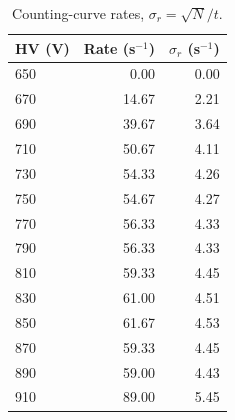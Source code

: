 \begin{table}[htbp]
\centering
\caption{Counting-curve rates, $\sigma_r=\sqrt{N}/t$.}
\label{tab:counting-rates}
\begin{tabular}{lrr}
\toprule
HV (V) & Rate (s$^{-1}$) & $\sigma_r$ (s$^{-1}$) \\
\midrule
650 & 0.00 & 0.00 \\
670 & 14.67 & 2.21 \\
690 & 39.67 & 3.64 \\
710 & 50.67 & 4.11 \\
730 & 54.33 & 4.26 \\
750 & 54.67 & 4.27 \\
770 & 56.33 & 4.33 \\
790 & 56.33 & 4.33 \\
810 & 59.33 & 4.45 \\
830 & 61.00 & 4.51 \\
850 & 61.67 & 4.53 \\
870 & 59.33 & 4.45 \\
890 & 59.00 & 4.43 \\
910 & 89.00 & 5.45 \\
\bottomrule
\end{tabular}
\end{table}
